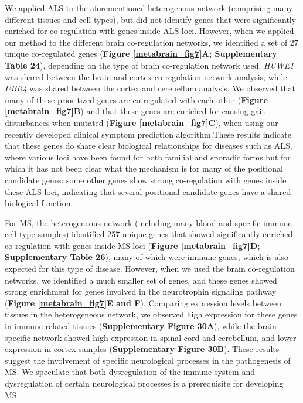 We applied ALS to the aforementioned heterogenous network\cite{deelenImprovingDiagnosticYield2019} (comprising many different tissues and cell types), but did not identify genes that were significantly enriched for co-regulation with genes inside ALS loci. However, when we applied our method to the different brain co-regulation networks, we identified a set of 27 unique co-regulated genes (\textbf{Figure \ref{metabrain_fig7}A; Supplementary Table 24}), depending on the type of brain co-regulation network used. \emph{HUWE1} was shared between the brain and cortex co-regulation network analysis, while \emph{UBR4} was shared between the cortex and cerebellum analysis. We observed that many of these prioritized genes are co-regulated with each other (\textbf{Figure \ref{metabrain_fig7}B}) and that these genes are enriched for causing gait disturbances when mutated (\textbf{Figure \ref{metabrain_fig7}C}), when using our recently developed clinical symptom prediction algorithm\cite{deelenImprovingDiagnosticYield2019}.These results indicate that these genes do share clear biological relationships for diseases such as ALS, where various loci have been found for both familial and sporadic forms but for which it has not been clear what the mechanism is for many of the positional candidate genes: some other genes show strong co-regulation with genes inside these ALS loci, indicating that several positional candidate genes have a shared biological function.  

For MS, the heterogeneous network (including many blood and specific immune cell type samples) identified 257 unique genes that showed significantly enriched co-regulation with genes inside MS loci (\textbf{Figure \ref{metabrain_fig7}D; Supplementary Table 26}), many of which were immune genes, which is also expected for this type of disease. However, when we used the brain co-regulation networks, we identified a much smaller set of genes, and these genes showed strong enrichment for genes involved in the neurotrophin signaling pathway (\textbf{Figure \ref{metabrain_fig7}E and F}). Comparing expression levels between tissues in the heterogeneous network, we observed high expression for these genes in immune related tissues (\textbf{Supplementary Figure 30A}), while the brain specific network showed high expression in spinal cord and cerebellum, and lower expression in cortex samples (\textbf{Supplementary Figure 30B}). These results suggest the involvement of specific neurological processes in the pathogenesis of MS. We speculate that both dysregulation of the immune system and dysregulation of certain neurological processes is a prerequisite for developing MS. 

